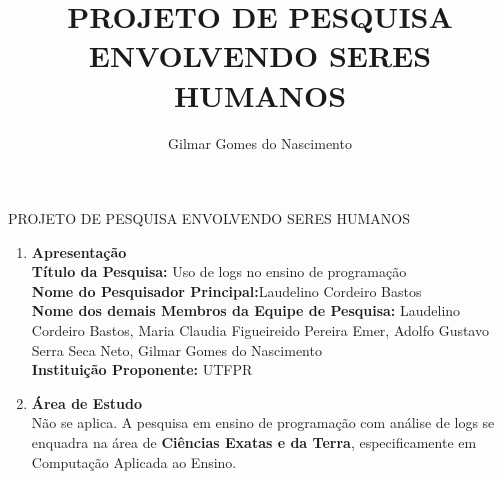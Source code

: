 \documentclass[10pt,a4paper]{article}
\author{Gilmar Gomes do Nascimento}
\title{PROJETO DE PESQUISA ENVOLVENDO SERES HUMANOS}
\begin{document}
\begin{center} PROJETO DE PESQUISA ENVOLVENDO SERES HUMANOS \end{center}
\begin{enumerate}
\item \textbf{Apresentação}\\
\textbf{Título da Pesquisa:} Uso de logs no ensino de programação\\
\textbf{Nome do Pesquisador Principal:}Laudelino Cordeiro Bastos\\ %
\textbf{Nome dos demais Membros da Equipe de Pesquisa:} Laudelino Cordeiro Bastos, Maria Claudia Figueireido Pereira Emer, Adolfo Gustavo Serra Seca Neto, Gilmar Gomes do Nascimento\\
\textbf{Instituição Proponente:} UTFPR\\
\item \textbf{Área de Estudo} \\
Não se aplica. A pesquisa em ensino de programação com análise de logs se enquadra na área de \textbf{Ciências Exatas e da Terra}, especificamente em Computação Aplicada ao Ensino.


\end{enumerate}
\end{document}
